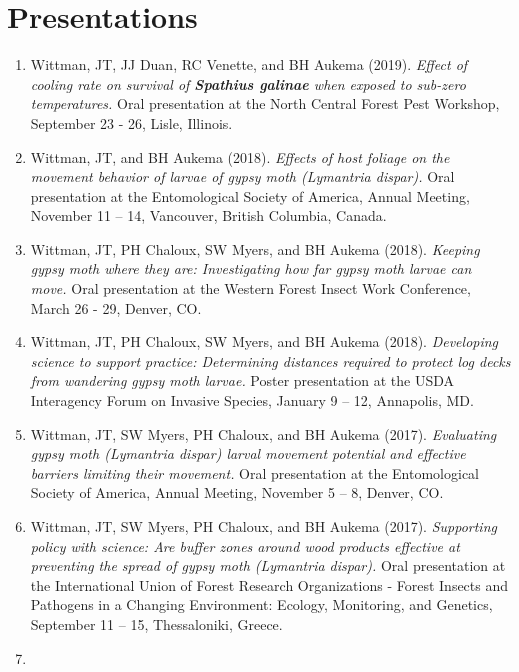 \documentclass[11pt, a4paper]{awesome-cv}
\providecommand{\tightlist}{%
	\setlength{\itemsep}{0pt}\setlength{\parskip}{0pt}}
\begin{document}
\nocite{Short,
Hallinen,
Stivers2019,
Wittman2018,
Wittman2019,
Wittman2017,
Wittman2013}

\hypertarget{presentations}{%
\section{Presentations}\label{presentations}}

\begin{enumerate}
\def\labelenumi{\arabic{enumi}.}
\tightlist
\item
  Wittman, JT, JJ Duan, RC Venette, and BH Aukema (2019). \emph{Effect of cooling rate on survival of \textbf{Spathius galinae} when exposed to sub-zero temperatures.} Oral presentation at the North Central Forest Pest Workshop, September 23 - 26, Lisle, Illinois.
\item
  Wittman, JT, and BH Aukema (2018). \emph{Effects of host foliage on the movement behavior of larvae of gypsy moth (Lymantria dispar).} Oral presentation at the Entomological Society of America, Annual Meeting, November 11 -- 14, Vancouver, British Columbia, Canada.
\item
  Wittman, JT, PH Chaloux, SW Myers, and BH Aukema (2018). \emph{Keeping gypsy moth where they are: Investigating how far gypsy moth larvae can move.} Oral presentation at the Western Forest Insect Work Conference, March 26 - 29, Denver, CO.
\item
  Wittman, JT, PH Chaloux, SW Myers, and BH Aukema (2018). \emph{Developing science to support practice: Determining distances required to protect log decks from wandering gypsy moth larvae.} Poster presentation at the USDA Interagency Forum on Invasive Species, January 9 -- 12, Annapolis, MD.
\item
  Wittman, JT, SW Myers, PH Chaloux, and BH Aukema (2017). \emph{Evaluating gypsy moth (Lymantria dispar) larval movement potential and effective barriers limiting their movement.} Oral presentation at the Entomological Society of America, Annual Meeting, November 5 -- 8, Denver, CO.
\item
  Wittman, JT, SW Myers, PH Chaloux, and BH Aukema (2017). \emph{Supporting policy with science: Are buffer zones around wood products effective at preventing the spread of gypsy moth (Lymantria dispar).} Oral presentation at the International Union of Forest Research Organizations - Forest Insects and Pathogens in a Changing Environment: Ecology, Monitoring, and Genetics, September 11 -- 15, Thessaloniki, Greece.
\item

\end{enumerate}
\end{document}
